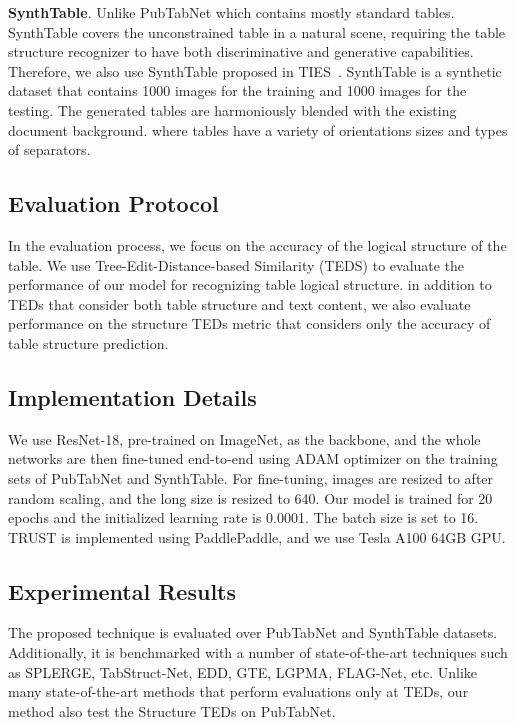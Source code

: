\documentclass[lettersize,journal]{IEEEtran}
\begin{document}
\textbf{SynthTable}. Unlike PubTabNet which contains mostly standard tables. SynthTable covers the unconstrained table in a natural scene, requiring the table structure recognizer to have both discriminative and generative capabilities. Therefore, we also use SynthTable proposed in TIES~\cite{qasim2019rethinking}. SynthTable is a synthetic dataset that contains 1000 images for the training and 1000 images for the testing. The generated tables are harmoniously blended with the existing document background. where tables have a variety of orientations sizes and types of separators. 

\subsection{Evaluation Protocol}
In the evaluation process, we focus on the accuracy of the logical structure of the table. We use Tree-Edit-Distance-based Similarity (TEDS\cite{zhong2020image}) to evaluate the performance of our model for recognizing table logical structure. in addition to TEDs that consider both table structure and text content, we also evaluate performance on the structure TEDs metric that considers only the accuracy of table structure prediction.



\subsection{Implementation Details}
We use ResNet-18, pre-trained on ImageNet\cite{krizhevsky2012imagenet}, as the backbone, and the whole networks are then fine-tuned end-to-end using ADAM\cite{kingma2014adam} optimizer on the training sets of PubTabNet\cite{zhong2020image} and SynthTable. For fine-tuning, images are resized to  after random scaling, and the long size is resized to 640. Our model is trained for 20 epochs and the initialized learning rate is 0.0001. The batch size is set to 16. TRUST is implemented using PaddlePaddle\cite{ma2019paddlepaddle}, and we use Tesla A100 64GB GPU.

\subsection{Experimental Results}
The proposed technique is evaluated over PubTabNet and SynthTable datasets. Additionally, it is benchmarked with a number of state-of-the-art techniques such as SPLERGE\cite{tensmeyer2019deep}, TabStruct-Net\cite{raja2020table}, EDD\cite{zhong2020image}, GTE\cite{zheng2021global}, LGPMA\cite{qiao2021lgpma}, FLAG-Net\cite{liu2021show}, etc. Unlike many state-of-the-art methods that perform evaluations only at TEDs, our method also test the Structure TEDs on PubTabNet.
\end{document}
